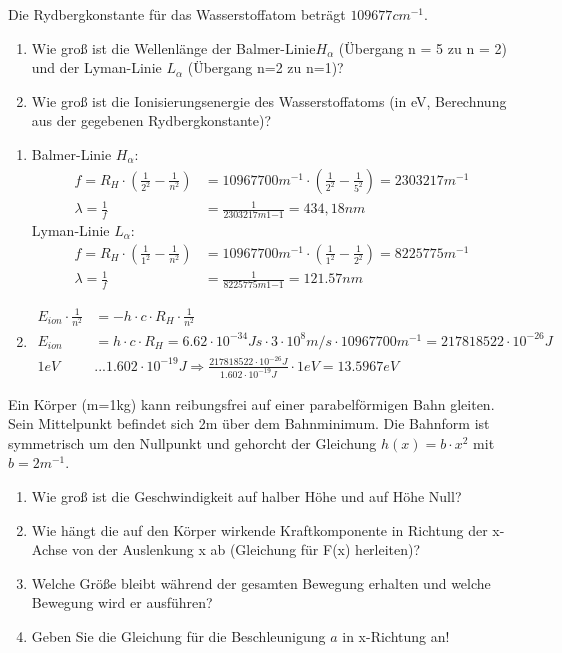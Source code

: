 \documentclass[12pt,a4paper,ngerman]{article}
\begin{document}
\begin{framed}
Die Rydbergkonstante für das Wasserstoffatom beträgt $109677cm^{-1}$. 
\begin{enumerate}
\item Wie groß ist die Wellenlänge der Balmer-Linie$H_\alpha$ (Übergang n = 5 zu n = 2) und der Lyman-Linie $L_\alpha$ (Übergang n=2 zu n=1)?
\item Wie groß ist die Ionisierungsenergie des Wasserstoffatoms (in eV, Berechnung aus der gegebenen Rydbergkonstante)?
\end{enumerate}
\end{framed}
\begin{enumerate}
\item Balmer-Linie $H_\alpha$:
\begin{align*}
f = R_H\cdot \left(\frac{1}{2^2} - \frac{1}{n^2}\right) &= 10967700m^{-1} \cdot \left(\frac{1}{2^2} - \frac{1}{5^2}\right) = 2303217m^{-1} \\
\lambda = \frac{1}{f} &= \frac{1}{2303217m1{-1}} = 434,18nm
\end{align*}
Lyman-Linie $L_\alpha$:
\begin{align*}
f = R_H\cdot \left(\frac{1}{1^2} - \frac{1}{n^2}\right) &= 10967700m^{-1} \cdot \left(\frac{1}{1^2} - \frac{1}{2^2}\right) = 8225775m^{-1} \\
\lambda = \frac{1}{f} &= \frac{1}{8225775m1{-1}} = 121.57nm
\end{align*}
\item \begin{align*}
E_{ion} \cdot \frac{1}{n^2} &= -h \cdot c \cdot R_H \cdot \frac{1}{n^2} \\
E_{ion} &= h \cdot c \cdot R_H = 6.62 \cdot 10^{-34}Js \cdot 3 \cdot 10^8m/s \cdot 10967700m^{-1} = 217818522 \cdot 10^{-26}J \\
1eV &... 1.602 \cdot 10^{-19}J \Rightarrow \frac{217818522 \cdot 10^{-26}J}{1.602 \cdot 10^{-19}J} \cdot 1eV = 13.5967eV
\end{align*}
\end{enumerate}

\pagebreak

\begin{framed}
Ein Körper (m=1kg) kann reibungsfrei auf einer parabelförmigen Bahn gleiten. Sein Mittelpunkt befindet sich 2m über dem Bahnminimum. Die Bahnform ist symmetrisch um den Nullpunkt und gehorcht der Gleichung $h(x) = b \cdot x^2$ mit $b = 2m^{-1}$. 
\begin{enumerate}
\item Wie groß ist die Geschwindigkeit auf halber Höhe und auf Höhe Null?
\item Wie hängt die auf den Körper wirkende Kraftkomponente in Richtung der x-Achse von der Auslenkung x ab (Gleichung für F(x) herleiten)?
\item Welche Größe bleibt während der gesamten Bewegung erhalten und welche Bewegung wird er ausführen?
\item Geben Sie die Gleichung für die Beschleunigung $a$ in x-Richtung an!
\end{enumerate}
\end{framed}
\end{document}
